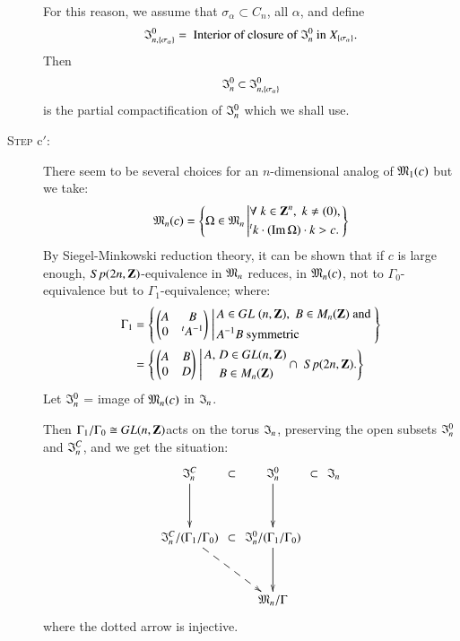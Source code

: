 \begin{description}
For this reason, we assume that $\sigma_\alpha  \subset C_n$, all $\alpha$, and define
$$
\mathfrak{I}^0_{n, \{\sigma_\alpha\}} = \text{ Interior of closure of } \mathfrak{I}^0_n \text{ in } X_{\{\sigma_\alpha\}}.
$$
Then 
$$
\mathfrak{I}^0_n \subset \mathfrak{I}^0_{n,\{\sigma_\alpha\}}
$$
is the partial compactification of $\mathfrak{I}^0_n$ which we shall use.

\item[\textsc{Step} c$'$:]  There seem to be several choices for an $n$-dimensional analog of $\mathfrak{M}_1(c)$ but we take:
$$
\mathfrak{M}_n(c) = 
\left\{\Omega \in \mathfrak{M}_n \left|
\begin{aligned}
&\forall \; k \in \mathbf{Z}^n, \; k \neq (0), \\
& {}^t k \cdot (\operatorname{Im} \Omega) \cdot k > c.
\end{aligned}
\right.
 \right\}
$$
By Siegel-Minkowski reduction theory, it can be shown that if $c$ is large enough, $Sp (2n, \mathbf{Z})$-equivalence in $\mathfrak{M}_n$ reduces, in $\mathfrak{M}_n (c)$, not to $\Gamma_0$-equivalence but to $\Gamma_1$-equivalence; where:
\begin{align*}
\Gamma_1 & = \left\{
\left. 
\begin{pmatrix}
A & B \\
0 & {}^t A^{-1}
\end{pmatrix} \;
\right|
\begin{aligned}
& A \in G L \; (n, \mathbf{Z}), \; B \in M_n (\mathbf{Z}) \text{ and }\\
& A^{-1} B \text{ symmetric}
\end{aligned} \right\}\\
& = \left\{
\left. 
\begin{pmatrix}
A &  B\\
0 & D
\end{pmatrix}\; 
\right|
\begin{aligned}
A, \;&  D \in G L (n, \mathbf{Z})\\
& B \in M_n (\mathbf{Z})
\end{aligned}
\cap \; Sp (2n, \mathbf{Z}).
\right\}
\end{align*}
Let $\mathfrak{I}^0_n$ = image of $\mathfrak{M}_n(c)$ in $\mathfrak{I}_n$.

Then  $\Gamma_1 / \Gamma_0 \cong G L (n, \mathbf{Z})$\pageoriginale acts on the torus $\mathfrak{I}_n$, preserving the open subsets $\mathfrak{I}^0_n$ and $\mathfrak{I}^C_n$, and we get the situation:
$$
\xymatrix@R=1.2cm@C=0.05cm{
\fI^C_n \ar[d] & \subset & \fI^0_n \ar[d] & \subset & \fI_n\\
\fI^C_n / (\Gamma_1 / \Gamma_0)  \ar@{-->}[drr] & \subset & \fI^0_n / (\Gamma_1 / \Gamma_0)\ar[d] & & \\
& & \fM_n/ \Gamma & & 
}
$$
where the dotted arrow is injective.


\end{description}
